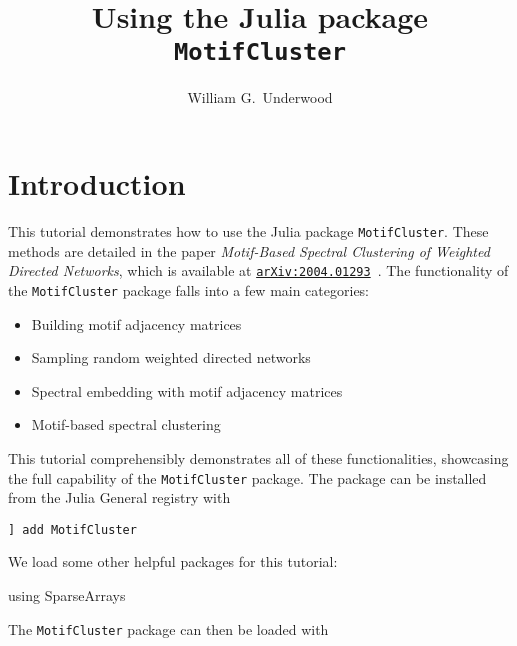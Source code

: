 \documentclass{article}
\title{Using the Julia package \texttt{MotifCluster}}
\author{William G.\ Underwood}
\begin{document}
\maketitle
\tableofcontents

\pagebreak

\section{Introduction}

This tutorial demonstrates how to use the Julia package \texttt{MotifCluster}.
These methods are detailed in the paper
\textit{Motif-Based Spectral Clustering of Weighted Directed Networks},
which is available at
\href{https://arxiv.org/abs/2004.01293}{\texttt{arXiv:2004.01293}}~\cite{UnderwoodElliottCucuringu_2020_Motifs}.
The functionality of the \texttt{MotifCluster} package falls into a few main
categories:

\begin{itemize}
\item Building motif adjacency matrices
\item Sampling random weighted directed networks
\item Spectral embedding with motif adjacency matrices
\item Motif-based spectral clustering
\end{itemize}

This tutorial comprehensibly demonstrates all of these functionalities,
showcasing the full capability of the \texttt{MotifCluster} package.
The package can be installed from the Julia General registry with

\begin{tcolorbox}[colback=black!5!white,colframe=black!15!white]
\texttt{] add MotifCluster}
\end{tcolorbox}

We load some other helpful packages for this tutorial:

\begin{tcolorbox}[colback=black!5!white,colframe=black!15!white]
\begin{juliablock}
using SparseArrays
\end{juliablock}
\end{tcolorbox}



The \texttt{MotifCluster} package can then be loaded with
\end{document}
